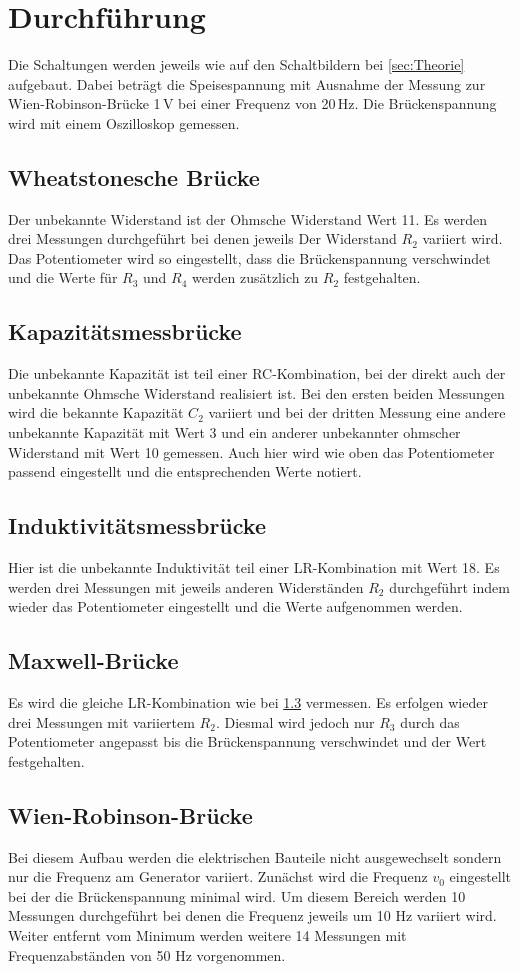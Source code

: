 \section{Durchführung}
\label{sec:Durchführung}

Die Schaltungen werden jeweils wie auf den Schaltbildern bei 
\ref{sec:Theorie} aufgebaut. Dabei beträgt die
Speisespannung mit Ausnahme der Messung
zur Wien-Robinson-Brücke 1\,V bei einer Frequenz von 20\,Hz. Die Brückenspannung wird
mit einem Oszilloskop gemessen.
\subsection{Wheatstonesche Brücke}
Der unbekannte Widerstand ist der Ohmsche Widerstand Wert 11.
Es werden drei Messungen durchgeführt bei denen jeweils Der Widerstand $R_2$
variiert wird. Das Potentiometer wird so eingestellt,
dass die Brückenspannung verschwindet und die Werte
für $R_3$ und $R_4$ werden zusätzlich zu $R_2$ festgehalten.
\subsection{Kapazitätsmessbrücke}
Die unbekannte Kapazität ist teil einer RC-Kombination,
bei der direkt auch der unbekannte Ohmsche Widerstand realisiert ist.
Bei den ersten beiden Messungen wird die bekannte Kapazität $C_2$ variiert
und bei der dritten Messung eine andere unbekannte Kapazität mit Wert 3
und ein anderer unbekannter ohmscher Widerstand mit Wert 10 gemessen.
Auch hier wird wie oben das Potentiometer passend eingestellt und die
entsprechenden Werte notiert.
\subsection{Induktivitätsmessbrücke}
\label{sec:Indu}
Hier ist die unbekannte Induktivität teil einer LR-Kombination
mit Wert 18. Es werden drei Messungen mit jeweils anderen Widerständen $R_2$
durchgeführt indem wieder das Potentiometer eingestellt und die Werte aufgenommen werden.
\subsection{Maxwell-Brücke}
Es wird die gleiche LR-Kombination wie bei \ref{sec:Indu} vermessen.
Es erfolgen wieder drei Messungen mit variiertem $R_2$. Diesmal
wird jedoch nur $R_3$ durch das Potentiometer angepasst bis die
Brückenspannung verschwindet und der Wert festgehalten.

\subsection{Wien-Robinson-Brücke}
Bei diesem Aufbau werden die elektrischen Bauteile
nicht ausgewechselt sondern nur die Frequenz am 
Generator variiert. Zunächst wird die Frequenz $v_0$ eingestellt
bei der die Brückenspannung minimal wird. Um diesem Bereich werden
10 Messungen durchgeführt bei denen die Frequenz jeweils um 10 Hz
variiert wird. Weiter entfernt vom Minimum werden weitere 14 Messungen
mit Frequenzabständen von 50 Hz vorgenommen.

